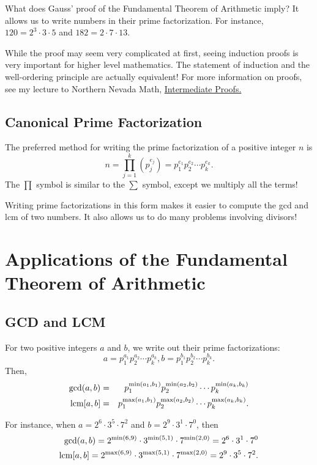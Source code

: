What does Gauss' proof of the Fundamental Theorem of Arithmetic imply? It allows us to write numbers in their prime factorization. For instance, $120=2^3\cdot 3\cdot 5$ and $182=2\cdot 7\cdot 13$. 

While the proof may seem very complicated at first, seeing induction proofs is very important for higher level mathematics. The statement of induction and the well-ordering principle are actually equivalent! For more information on proofs, see my lecture to Northern Nevada Math, \color{Orange}\href{https://numbertheoryguydotcom.files.wordpress.com/2016/03/intermediateproofs.pdf}{Intermediate Proofs.}

\clearpage

\subsection{Canonical Prime Factorization}

\color{black} The preferred method for writing the prime factorization of a positive integer $n$ is $$n=\prod_{j=1}^{k}\left(p_j^{e_j}\right)=p_1^{e_1}p_2^{e_2}\cdots p_k^{e_k}.$$ 
The $\prod$ symbol is similar to the $\sum$ symbol, except we multiply all the terms!

Writing prime factorizations in this form makes it easier to compute the gcd and lcm of two numbers. It also allows us to do many problems involving divisors!

\section{Applications of the Fundamental Theorem of Arithmetic}

\subsection{GCD and LCM}
For two positive integers $a$ and $b$, we write out their prime factorizations: $$a=p_1^{a_1}p_2^{a_2}\cdots p_k^{a_k}, b=p_1^{b_1}p_2^{b_2}\cdots p_k^{b_k}.$$ Then, \begin{eqnarray*} \gcd(a,b)&=&p_1^{\min(a_1, b_1)}p_2^{\min(a_2, b_2)}\cdots p_k^{\min(a_k, b_k)} \\ \operatorname{lcm}[a,b]&=&p_1^{\max(a_1, b_1)}p_2^{\max(a_2, b_2)}\cdots p_k^{\max(a_k, b_k)}. \end{eqnarray*}
\clearpage

For instance, when $a=2^6\cdot 3^5\cdot 7^2$ and $b=2^9\cdot 3^1\cdot 7^0$, then \begin{eqnarray*} \gcd(a,b)=2^{\min(6,9)}\cdot 3^{\min(5,1)}\cdot 7^{\min(2,0)}=2^6\cdot 3^1\cdot 7^0 \\ \operatorname{lcm}[a,b]=2^{\max(6,9)}\cdot 3^{\max(5,1)}\cdot 7^{\max(2,0)}=2^9\cdot 3^5\cdot 7^2. \end{eqnarray*}

